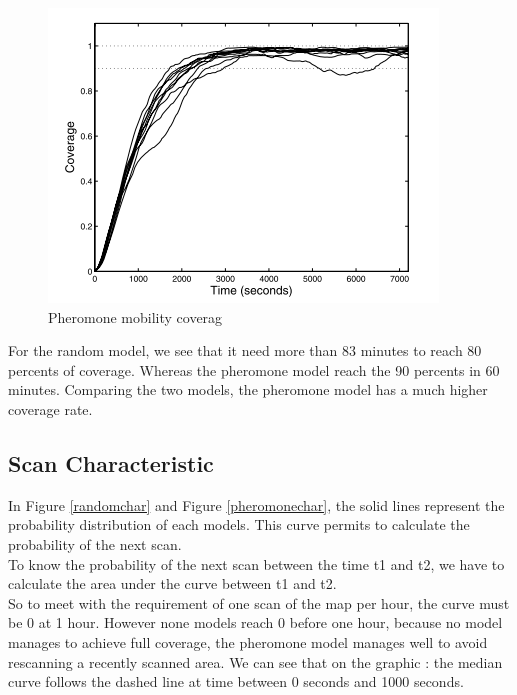 \begin{figure}[!h]
   \centering
   \includegraphics{../images/pheromone_coverage.png}
   \caption{\label{pheromonecoverage} Pheromone mobility coverag\cite{UAV}}
\end{figure}

For the random model, we see that it need more than 83 minutes to reach 80 percents of coverage. Whereas the pheromone model reach the 90 percents in 60 minutes. Comparing the two models, the pheromone model has a much higher coverage rate.

\subsection{Scan Characteristic}

In Figure \ref{randomchar} and Figure \ref{pheromonechar}, the solid lines represent the probability distribution of each models. This curve permits to calculate the probability of the next scan.\\
To know the probability of the next scan between the time t1 and t2, we have to calculate the area under the curve between t1 and t2.\\
So to meet with the requirement of one scan of the map per hour, the curve must be 0 at 1 hour. However none models reach 0 before one hour, because no model manages to achieve full coverage, the pheromone model manages well to avoid rescanning a recently scanned area. We can see that on the graphic : the median curve follows the dashed line at time between 0 seconds and 1000 seconds.

\newpage

